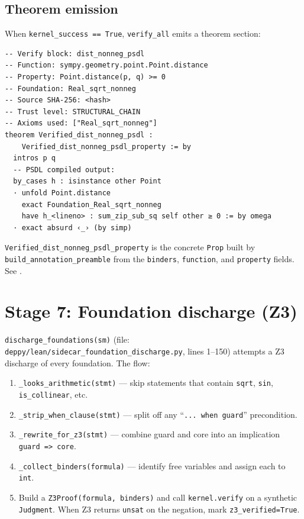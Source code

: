 \subsection{Theorem emission}

When \texttt{kernel\_success == True}, \texttt{verify\_all} emits a
\Lean{} theorem section:

\begin{lstlisting}[language=lean4]
-- Verify block: dist_nonneg_psdl
-- Function: sympy.geometry.point.Point.distance
-- Property: Point.distance(p, q) >= 0
-- Foundation: Real_sqrt_nonneg
-- Source SHA-256: <hash>
-- Trust level: STRUCTURAL_CHAIN
-- Axioms used: ["Real_sqrt_nonneg"]
theorem Verified_dist_nonneg_psdl :
    Verified_dist_nonneg_psdl_property := by
  intros p q
  -- PSDL compiled output:
  by_cases h : isinstance other Point
  · unfold Point.distance
    exact Foundation_Real_sqrt_nonneg
    have h_<lineno> : sum_zip_sub_sq self other ≥ 0 := by omega
  · exact absurd ‹_› (by simp)
\end{lstlisting}

\texttt{Verified\_dist\_nonneg\_psdl\_property} is the concrete
\texttt{Prop} built by \texttt{build\_annotation\_preamble} from
the \texttt{binders}, \texttt{function}, and \texttt{property}
fields.  See .

\section{Stage 7: Foundation discharge (Z3)}
\label{sec:foundation-discharge}

\texttt{discharge\_foundations(sm)} (file:
\texttt{deppy/lean/sidecar\_foundation\_discharge.py}, lines 1--150)
attempts a Z3 discharge of every foundation.  The flow:

\begin{enumerate}[leftmargin=1.7em]
  \item \texttt{\_looks\_arithmetic(stmt)} --- skip statements that
    contain \texttt{sqrt}, \texttt{sin}, \texttt{is\_collinear},
    etc.
  \item \texttt{\_strip\_when\_clause(stmt)} --- split off any
    ``\texttt{... when guard}'' precondition.
  \item \texttt{\_rewrite\_for\_z3(stmt)} --- combine guard and core
    into an implication \texttt{guard => core}.
  \item \texttt{\_collect\_binders(formula)} --- identify free
    variables and assign each to \texttt{int}.
  \item Build a \texttt{Z3Proof(formula, binders)} and call
    \texttt{kernel.verify} on a synthetic \texttt{Judgment}.  When
    Z3 returns \texttt{unsat} on the negation, mark
    \texttt{z3\_verified=True}.
\end{enumerate}

